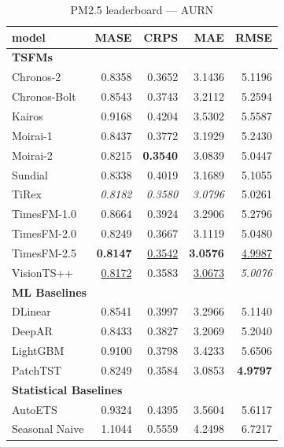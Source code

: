 \begin{table}[H]
\caption{PM2.5 leaderboard --- AURN}
\centering
\begin{small}
\begin{tabular}{lrrrr}
\toprule
model & MASE & CRPS & MAE & RMSE \\
\midrule
\multicolumn{5}{l}{\textbf{TSFMs}} \\
Chronos-2 & 0.8358 & 0.3652 & 3.1436 & 5.1196 \\
Chronos-Bolt & 0.8543 & 0.3743 & 3.2112 & 5.2594 \\
Kairos & 0.9168 & 0.4204 & 3.5302 & 5.5587 \\
Moirai-1 & 0.8437 & 0.3772 & 3.1929 & 5.2430 \\
Moirai-2 & 0.8215 & \textbf{0.3540} & 3.0839 & 5.0447 \\
Sundial & 0.8338 & 0.4019 & 3.1689 & 5.1055 \\
TiRex & \textit{0.8182} & \textit{0.3580} & \textit{3.0796} & 5.0261 \\
TimesFM-1.0 & 0.8664 & 0.3924 & 3.2906 & 5.2796 \\
TimesFM-2.0 & 0.8249 & 0.3667 & 3.1119 & 5.0480 \\
TimesFM-2.5 & \textbf{0.8147} & \underline{0.3542} & \textbf{3.0576} & \underline{4.9987} \\
VisionTS++ & \underline{0.8172} & 0.3583 & \underline{3.0673} & \textit{5.0076} \\
\midrule
\multicolumn{5}{l}{\textbf{ML Baselines}} \\
DLinear & 0.8541 & 0.3997 & 3.2966 & 5.1140 \\
DeepAR & 0.8433 & 0.3827 & 3.2069 & 5.2040 \\
LightGBM & 0.9100 & 0.3798 & 3.4233 & 5.6506 \\
PatchTST & 0.8249 & 0.3584 & 3.0853 & \textbf{4.9797} \\
\midrule
\multicolumn{5}{l}{\textbf{Statistical Baselines}} \\
AutoETS & 0.9324 & 0.4395 & 3.5604 & 5.6117 \\
Seasonal Naive & 1.1044 & 0.5559 & 4.2498 & 6.7217 \\
\bottomrule
\end{tabular}
\end{small}
\end{table}